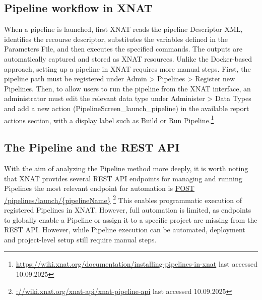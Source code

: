 \subsection{Pipeline workflow in XNAT}
When a pipeline is launched, first XNAT reads the pipeline Descriptor XML, identifies the recourse descriptor, substitutes the variables defined in the Parameters File, and then executes the specified commands. The outputs are automatically captured and stored as XNAT resources.
Unlike the Docker-based approach, setting up a pipeline in XNAT requires more manual steps. First, the pipeline path must be registered under Admin > Pipelines > Register new Pipelines. Then, to allow users to run the pipeline from the XNAT interface, an administrator must edit the relevant data type under Administer > Data Types and add a new action (PipelineScreen\_launch\_pipeline) in the available report actions section, with a display label such as Build or Run Pipeline.\footnote{\url{https://wiki.xnat.org/documentation/installing-pipelines-in-xnat} last accessed 10.09.2025}
\normalsize












\subsection{The Pipeline and the REST API}
With the aim of analyzing the Pipeline method more deeply, it is worth noting that XNAT provides several REST API endpoints for managing and running Pipelines the most relevant endpoint for automation is \url{POST /pipelines/launch/{pipelineName}} \footnote{\url{://wiki.xnat.org/xnat-api/xnat-pipeline-api} last accessed 10.09.2025}
This enables programmatic execution of registered Pipelines in XNAT. However, full automation is limited, as endpoints to globally enable a Pipeline or assign it to a specific project are missing from the REST API. However, while Pipeline execution can be automated, deployment and project-level setup still require manual steps.



